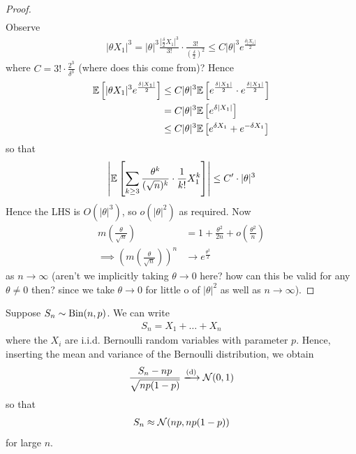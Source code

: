 \documentclass{../template/note}
\begin{document}
\begin{proof}
\begin{align*}
        \end{align*}
        Observe
        \begin{align*}
            |\theta X_1|^3 = |\theta|^3 \frac{\left|\frac{\delta}2 X_1\right|^3}{3!} \cdot \frac{3!}{\left(\frac{\delta}2\right)^2} \leq C|\theta|^3 e^{\frac{\delta|X_1|}{2}}
        \end{align*}
        where \(C = 3! \cdot \frac{2^3}{\delta^3}\) (where does this come from)? Hence
        \begin{align*}
            \mathbb E\left[|\theta X_1|^3 e^{\frac{\delta|X_1|}{2}}\right] &\leq C|\theta|^3 \mathbb E\left[e^{\frac{\delta|X_1|}{2}} \cdot e^{\frac{\delta|X_1|}{2}}\right] \\
            &= C|\theta|^3 \mathbb E\left[e^{\delta|X_1|}\right] \\
            &\leq C|\theta|^3 \mathbb E\left[e^{\delta X_1}+e^{-\delta X_1}\right]
        \end{align*}
        so that
        \begin{align*}
            \left|\mathbb E\left[\sum_{k \geq 3} \frac{\theta^k}{(\sqrt n)^k} \cdot \frac 1{k!} X_1^k\right]\right| \leq C' \cdot |\theta|^3
        \end{align*}
        Hence the LHS is \(O(|\theta|^3)\), so \(o(|\theta|^2)\) as required. Now
        \begin{align*}
            m\left(\frac{\theta}{\sqrt n}\right) &= 1 + \frac{\theta^2}{2n} + o\left(\frac{\theta^2}{n}\right) \\
            \implies \left(m\left(\frac{\theta}{\sqrt n}\right)\right)^n &\to e^{\frac{\theta^2}{2}}
        \end{align*}
        as \(n \to \infty\) (aren't we implicitly taking \(\theta \to 0\) here? how can this be valid for any \(\theta \neq 0\) then? since we take \(\theta \to 0\) for little o of \(|\theta|^2\) as well as \(n \to \infty\)).
    \end{proof}
    
    \begin{example}
        Suppose \(S_n \sim \operatorname{Bin}(n, p)\). We can write
        \begin{align*}
            S_n = X_1 + \dots + X_n
        \end{align*}
        where the \(X_i\) are i.i.d. Bernoulli random variables with parameter \(p\). Hence, inserting the mean and variance of the Bernoulli distribution, we obtain
        \begin{align*}
            \frac{S_n-np}{\sqrt{np(1-p)}} \dto \mc N(0, 1)
        \end{align*}
        so that
        \begin{align*}
            S_n \approx \mathcal{N}(np, np(1-p))
        \end{align*}
        for large \(n\).        
    \end{example}
    
\end{document}
